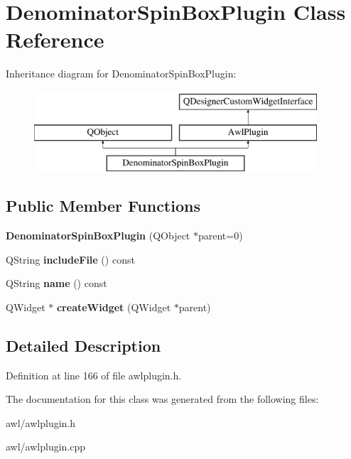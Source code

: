 \hypertarget{class_denominator_spin_box_plugin}{}\section{Denominator\+Spin\+Box\+Plugin Class Reference}
\label{class_denominator_spin_box_plugin}
Inheritance diagram for Denominator\+Spin\+Box\+Plugin\+:\begin{figure}[H]
\begin{center}
\leavevmode
\includegraphics[height=3.000000cm]{class_denominator_spin_box_plugin}
\end{center}
\end{figure}
\subsection*{Public Member Functions}
\begin{DoxyCompactItemize}
\item 
\mbox{\label{class_denominator_spin_box_plugin_a4c2b8f68a37bfdff441fdf101ff46ec0}} 
{\bfseries Denominator\+Spin\+Box\+Plugin} (Q\+Object $\ast$parent=0)
\item 
\mbox{\label{class_denominator_spin_box_plugin_a5c53d23545d560cb0d481493bf849821}} 
Q\+String {\bfseries include\+File} () const
\item 
\mbox{\label{class_denominator_spin_box_plugin_a589050f3ddc85802ff0edd8175fa9f1c}} 
Q\+String {\bfseries name} () const
\item 
\mbox{\label{class_denominator_spin_box_plugin_a3f146a012f69e4c0d446b20fe4a417e5}} 
Q\+Widget $\ast$ {\bfseries create\+Widget} (Q\+Widget $\ast$parent)
\end{DoxyCompactItemize}


\subsection{Detailed Description}


Definition at line 166 of file awlplugin.\+h.



The documentation for this class was generated from the following files\+:\begin{DoxyCompactItemize}
\item 
awl/awlplugin.\+h\item 
awl/awlplugin.\+cpp\end{DoxyCompactItemize}
